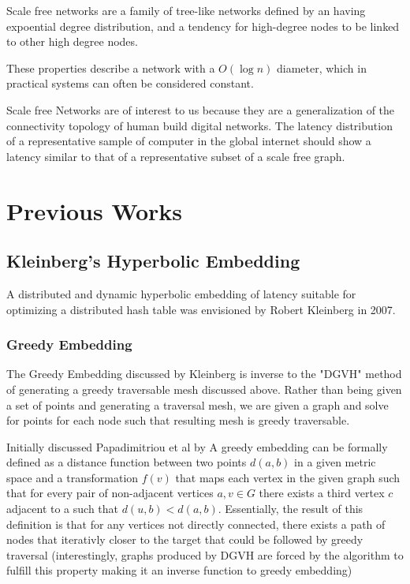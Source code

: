 Scale free networks are a family of tree-like networks defined by an having expoential  degree distribution, and a tendency for high-degree nodes to be linked to other high degree nodes.

These properties describe a network with a $O(\log{n})$ diameter, which in practical systems can often be considered constant.

Scale free Networks are of interest to us because they are a generalization of the connectivity topology of human build digital networks.
The latency distribution of a representative sample of computer in the global internet should show a latency similar to that of a representative subset of a scale free graph.


\section{Previous Works}

\subsection{Kleinberg's Hyperbolic Embedding}
A distributed and dynamic hyperbolic embedding of latency suitable for optimizing a distributed hash table was envisioned by Robert Kleinberg in 2007.

\subsubsection{Greedy Embedding}
The Greedy Embedding discussed by Kleinberg is inverse to the "DGVH" method of generating a greedy traversable mesh discussed above.
Rather than being given a set of points and generating a traversal mesh, we are given a graph and solve for points for each node such that resulting mesh is greedy traversable.

Initially discussed Papadimitriou et al\cite{papadimitriou2004conjecture} by A greedy embedding can be formally defined as a distance function between two points $d(a,b)$ in a given metric space and a transformation $f(v)$ that maps each vertex in the given graph such that for every pair of non-adjacent vertices $a,v\in G$ there exists a third vertex $c$ adjacent to a such that $d(u,b) < d(a,b)$. 
Essentially, the result of this definition is that for any vertices not directly connected, there exists a path of nodes that iterativly closer to the target that could be followed by greedy traversal (interestingly, graphs produced by DGVH are forced by the algorithm to fulfill this property making it an inverse function to greedy embedding)


